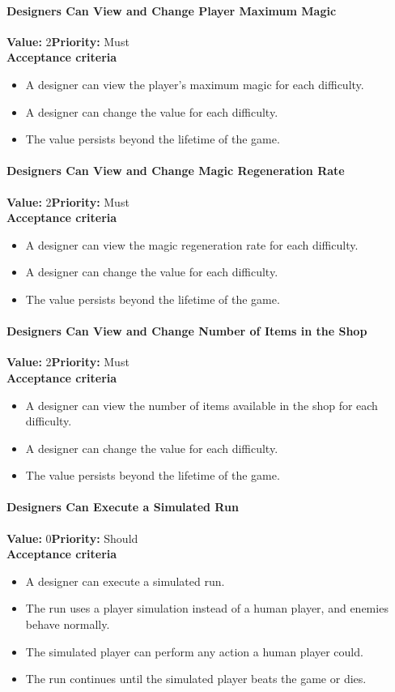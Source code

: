 \paragraph{Designers Can View and Change Player Maximum Magic}
\textbf{Value:} 2\quad \textbf{Priority:} Must\\
\textbf{Acceptance criteria}
\begin{itemize}
  \item A designer can view the player’s maximum magic for each difficulty.
  \item A designer can change the value for each difficulty.
  \item The value persists beyond the lifetime of the game.
\end{itemize}

\paragraph{Designers Can View and Change Magic Regeneration Rate}
\textbf{Value:} 2\quad \textbf{Priority:} Must\\
\textbf{Acceptance criteria}
\begin{itemize}
  \item A designer can view the magic regeneration rate for each difficulty.
  \item A designer can change the value for each difficulty.
  \item The value persists beyond the lifetime of the game.
\end{itemize}

\paragraph{Designers Can View and Change Number of Items in the Shop}
\textbf{Value:} 2\quad \textbf{Priority:} Must\\
\textbf{Acceptance criteria}
\begin{itemize}
  \item A designer can view the number of items available in the shop for each difficulty.
  \item A designer can change the value for each difficulty.
  \item The value persists beyond the lifetime of the game.
\end{itemize}

\paragraph{Designers Can Execute a Simulated Run}
\textbf{Value:} 0\quad \textbf{Priority:} Should\\
\textbf{Acceptance criteria}
\begin{itemize}
  \item A designer can execute a simulated run.
  \item The run uses a player simulation instead of a human player, and enemies behave normally.
  \item The simulated player can perform any action a human player could.
  \item The run continues until the simulated player beats the game or dies.
\end{itemize}

